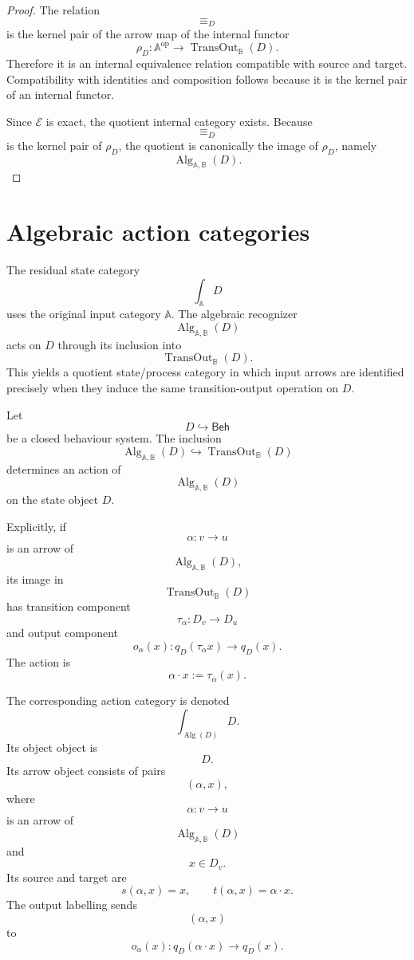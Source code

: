 \begin{proof}
The relation
\[
{\equiv_D}
\]
is the kernel pair of the arrow map of the internal functor
\[
\rho_D:
\mathbb A^{\mathrm{op}}
\to
\operatorname{TransOut}_{\mathbb B}(D).
\]
Therefore it is an internal equivalence relation compatible with source and
target. Compatibility with identities and composition follows because it is
the kernel pair of an internal functor.

Since \(\mathcal E\) is exact, the quotient internal category exists. Because
\[
{\equiv_D}
\]
is the kernel pair of \(\rho_D\), the quotient is canonically the image of
\(\rho_D\), namely
\[
\operatorname{Alg}_{\mathbb A,\mathbb B}(D).
\]
\end{proof}

\section{Algebraic action categories}
\label{sec:reiterman-algebraic-action-categories}

The residual state category
\[
\int_{\mathbb A}D
\]
uses the original input category \(\mathbb A\). The algebraic recognizer
\[
\operatorname{Alg}_{\mathbb A,\mathbb B}(D)
\]
acts on \(D\) through its inclusion into
\[
\operatorname{TransOut}_{\mathbb B}(D).
\]
This yields a quotient state/process category in which input arrows are
identified precisely when they induce the same transition-output operation
on \(D\).

\begin{definition}
\label{def:reiterman-algebraic-action-category}
Let
\[
D\hookrightarrow\mathsf{Beh}
\]
be a closed behaviour system. The inclusion
\[
\operatorname{Alg}_{\mathbb A,\mathbb B}(D)
\hookrightarrow
\operatorname{TransOut}_{\mathbb B}(D)
\]
determines an action of
\[
\operatorname{Alg}_{\mathbb A,\mathbb B}(D)
\]
on the state object \(D\).

Explicitly, if
\[
\alpha:v\to u
\]
is an arrow of
\[
\operatorname{Alg}_{\mathbb A,\mathbb B}(D),
\]
its image in
\[
\operatorname{TransOut}_{\mathbb B}(D)
\]
has transition component
\[
\tau_\alpha:D_v\to D_u
\]
and output component
\[
o_\alpha(x):q_D(\tau_\alpha x)\to q_D(x).
\]
The action is
\[
\alpha\cdot x:=\tau_\alpha(x).
\]

The corresponding action category is denoted
\[
\int_{\operatorname{Alg}(D)}D.
\]
Its object object is
\[
D.
\]
Its arrow object consists of pairs
\[
(\alpha,x),
\]
where
\[
\alpha:v\to u
\]
is an arrow of
\[
\operatorname{Alg}_{\mathbb A,\mathbb B}(D)
\]
and
\[
x\in D_v.
\]
Its source and target are
\[
s(\alpha,x)=x,
\qquad
t(\alpha,x)=\alpha\cdot x.
\]
The output labelling sends
\[
(\alpha,x)
\]
to
\[
o_\alpha(x):q_D(\alpha\cdot x)\to q_D(x).
\]
\end{definition}

